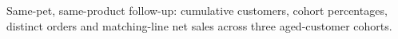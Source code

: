 Same-pet, same-product follow-up: cumulative customers, cohort percentages, distinct orders and matching-line net sales across three aged-customer cohorts.
